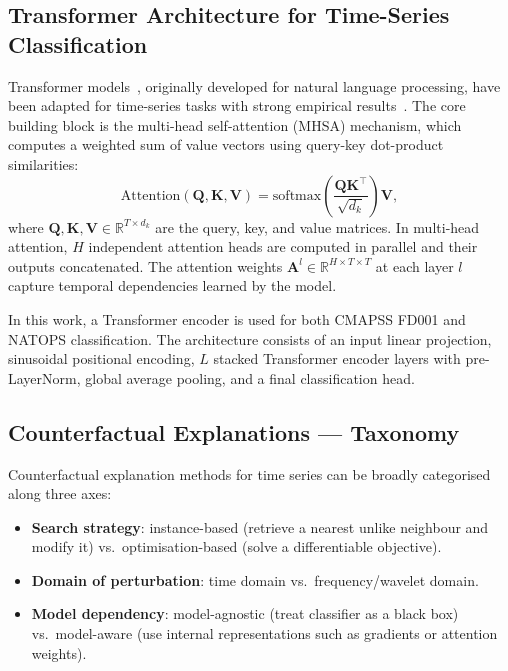 \subsection{Transformer Architecture for Time-Series Classification}

Transformer models~\cite{vaswani2017attention}, originally developed for natural language processing, have been adapted for time-series tasks with strong empirical results~\cite{zerveas2021transformer}. The core building block is the multi-head self-attention (MHSA) mechanism, which computes a weighted sum of value vectors using query-key dot-product similarities:
\begin{equation}
    \text{Attention}(\mathbf{Q}, \mathbf{K}, \mathbf{V}) = \text{softmax}\!\left(\frac{\mathbf{Q}\mathbf{K}^\top}{\sqrt{d_k}}\right)\mathbf{V},
\end{equation}
where $\mathbf{Q}, \mathbf{K}, \mathbf{V} \in \mathbb{R}^{T \times d_k}$ are the query, key, and value matrices. In multi-head attention, $H$ independent attention heads are computed in parallel and their outputs concatenated. The attention weights $\mathbf{A}^l \in \mathbb{R}^{H \times T \times T}$ at each layer $l$ capture temporal dependencies learned by the model.

In this work, a Transformer encoder is used for both CMAPSS FD001 and NATOPS classification. The architecture consists of an input linear projection, sinusoidal positional encoding, $L$ stacked Transformer encoder layers with pre-LayerNorm, global average pooling, and a final classification head.

\subsection{Counterfactual Explanations — Taxonomy}

Counterfactual explanation methods for time series can be broadly categorised along three axes:
\begin{itemize}
    \item \textbf{Search strategy}: instance-based (retrieve a nearest unlike neighbour and modify it) vs.\ optimisation-based (solve a differentiable objective).
    \item \textbf{Domain of perturbation}: time domain vs.\ frequency/wavelet domain.
    \item \textbf{Model dependency}: model-agnostic (treat classifier as a black box) vs.\ model-aware (use internal representations such as gradients or attention weights).
\end{itemize}

